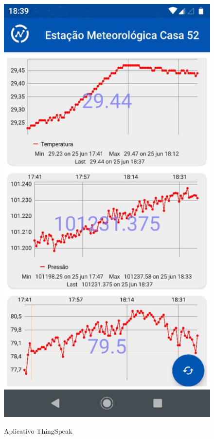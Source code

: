 \begin{figure} [!h]
    \centering
    \caption{Aplicativo ThingSpeak}
    \includegraphics [scale=0.15]{Figuras/img_app.png}
    \label{fig:img_app}
\end{figure}

